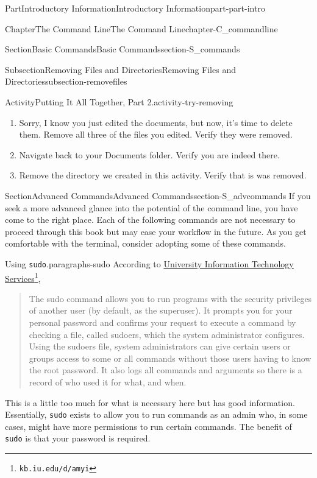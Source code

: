 \documentclass[twoside,10pt,]{book}
\newcommand{\mono}[1]{\texttt{#1}}
\begin{document}
\begin{partptx}{Part}{Introductory Information}{}{Introductory Information}{}{}{part-part-intro}
\begin{chapterptx}{Chapter}{The Command Line}{}{The Command Line}{}{}{chapter-C_commandline}
\begin{sectionptx}{Section}{Basic Commands}{}{Basic Commands}{}{}{section-S_commands}
\begin{subsectionptx}{Subsection}{Removing Files and Directories}{}{Removing Files and Directories}{}{}{subsection-removefiles}
\begin{activity}{Activity}{Putting It All Together, Part 2.}{activity-try-removing}
\begin{enumerate}[font=\bfseries,label=(\alph*),ref=\alph*]
\item{}Sorry, I know you just edited the documents, but now, it's time to delete them. Remove all three of the files you edited. Verify they were removed.%
\item{}Navigate back to your Documents folder. Verify you are indeed there.%
\item{}Remove the directory we created in this activity. Verify that is was removed.%
\end{enumerate}%
\end{activity}%
\end{subsectionptx}
\end{sectionptx}
%
%
\typeout{************************************************}
\typeout{************************************************}
%
\begin{sectionptx}{Section}{Advanced Commands}{}{Advanced Commands}{}{}{section-S_advcommands}
%
%
%
If you seek a more advanced glance into the potential of the command line, you have come to the right place. Each of the following commands are not necessary to proceed through this book but may ease your workflow in the future. As you get comfortable with the terminal, consider adopting some of these commands.%
\begin{paragraphs}{Using \mono{sudo}.}{paragraphs-sudo}%
%
%
According to \href{https://kb.iu.edu/d/amyi}{University Information Technology Services}\footnote{\nolinkurl{kb.iu.edu/d/amyi}\label{fn-sudo-d-b}},%
\begin{quote}%
The sudo command allows you to run programs with the security privileges of another user (by default, as the superuser). It prompts you for your personal password and confirms your request to execute a command by checking a file, called sudoers, which the system administrator configures. Using the sudoers file, system administrators can give certain users or groups access to some or all commands without those users having to know the root password. It also logs all commands and arguments so there is a record of who used it for what, and when.%
\end{quote}
This is a little too much for what is necessary here but has good information. Essentially, \mono{sudo} exists to allow you to run commands as an admin who, in some cases, might have more permissions to run certain commands. The benefit of \mono{sudo} is that your password is required.%

\end{paragraphs}
\end{sectionptx}
\end{chapterptx}
\end{partptx}
\end{document}
